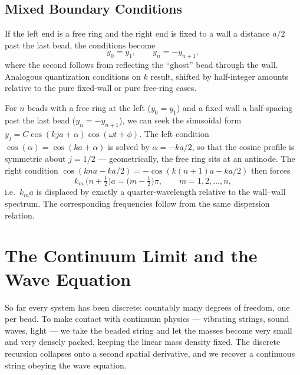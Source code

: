 \subsection{Mixed Boundary Conditions}

If the left end is a free ring and the right end is fixed to a wall a distance $a/2$ past the last bead, the conditions become
\begin{equation}
    y_0 = y_1, \qquad y_n = -y_{n+1},
\end{equation}
where the second follows from reflecting the ``ghost'' bead through the wall. Analogous quantization conditions on $k$ result, shifted by half-integer amounts relative to the pure fixed-wall or pure free-ring cases.

\begin{example}
For $n$ beads with a free ring at the left ($y_0 = y_1$) and a fixed wall a half-spacing past the last bead ($y_n = -y_{n+1}$), we can seek the sinusoidal form $y_j = C\cos(kja + \alpha)\cos(\omega t + \phi)$. The left condition $\cos(\alpha) = \cos(ka + \alpha)$ is solved by $\alpha = -ka/2$, so that the cosine profile is symmetric about $j = 1/2$ --- geometrically, the free ring sits at an antinode. The right condition $\cos(kna - ka/2) = -\cos(k(n+1)a - ka/2)$ then forces
\begin{equation}
    k_m\,\bigl(n + \tfrac{1}{2}\bigr) a = \bigl(m - \tfrac{1}{2}\bigr)\pi, \qquad m = 1, 2, \ldots, n,
\end{equation}
i.e.\ $k_m a$ is displaced by exactly a quarter-wavelength relative to the wall--wall spectrum. The corresponding frequencies follow from the same dispersion relation.
\end{example}

\section{The Continuum Limit and the Wave Equation}

So far every system has been discrete: countably many degrees of freedom, one per bead. To make contact with continuum physics --- vibrating strings, sound waves, light --- we take the beaded string and let the masses become very small and very densely packed, keeping the linear mass density fixed. The discrete recursion collapses onto a second spatial derivative, and we recover a continuous string obeying the wave equation.

